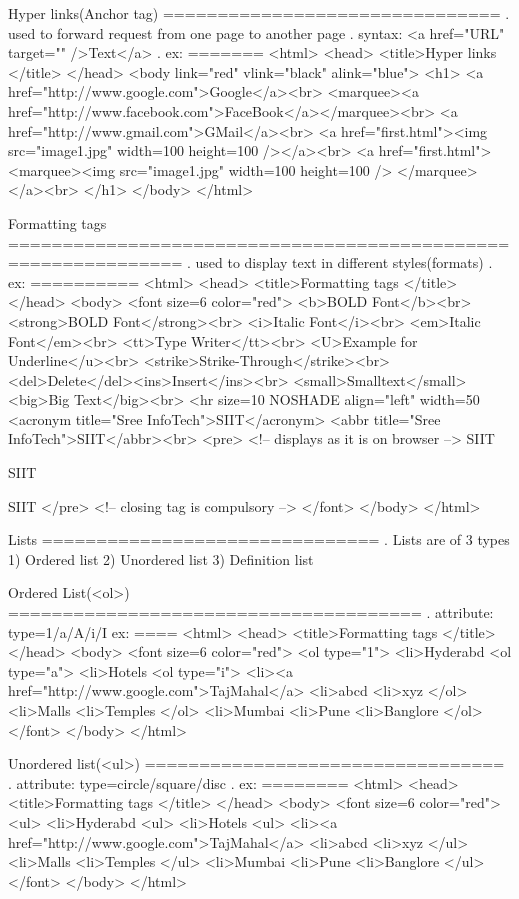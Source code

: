Hyper links(Anchor tag)
===============================
. used to forward request from one page to another page
. syntax: <a href="URL" target="" />Text</a>
. ex:
=======
<html>
  <head>
    <title>Hyper links </title>
  </head>
  <body link="red" vlink="black" alink="blue">
    <h1>
	  <a href="http://www.google.com">Google</a><br>
	  <marquee><a href="http://www.facebook.com">FaceBook</a></marquee><br>
	  <a href="http://www.gmail.com">GMail</a><br>
	  <a href="first.html"><img src="image1.jpg" width=100 height=100 /></a><br>
	  <a href="first.html">
	    <marquee><img src="image1.jpg" width=100 height=100 /> </marquee>
	  </a><br>
    </h1>
  </body>
</html>

Formatting tags
==============================================================
. used to display text in different styles(formats)
. ex:
==========
<html>
  <head>
    <title>Formatting tags </title>
  </head>
  <body>
    <font size=6 color="red">
	   <b>BOLD Font</b><br>
	   <strong>BOLD Font</strong><br>
	   <i>Italic Font</i><br>
	   <em>Italic Font</em><br>
	   <tt>Type Writer</tt><br>
	   <U>Example for Underline</u><br>
	   <strike>Strike-Through</strike><br>
	   <del>Delete</del><ins>Insert</ins><br>
	   <small>Smalltext</small><big>Big Text</big><br>
	   <hr size=10 NOSHADE align="left" width=50%
	   <acronym title="Sree InfoTech">SIIT</acronym>
	   <abbr title="Sree InfoTech">SIIT</abbr><br>
	   <pre> <!-- displays as it is on browser -->
	   SIIT
	      
		  SIIT

		     SIIT
	   </pre> <!-- closing tag is compulsory -->
	</font>
  </body>
</html>

Lists
===============================
. Lists are of 3 types
  1) Ordered list
  2) Unordered list
  3) Definition list

Ordered List(<ol>)
======================================
. attribute: type=1/a/A/i/I
ex:
====
<html>
  <head>
    <title>Formatting tags </title>
  </head>
  <body>
    <font size=6 color="red">
	  <ol type="1">
	     <li>Hyderabd
		 <ol type="a">
		    <li>Hotels
			  <ol type="i">
			     <li><a href="http://www.google.com">TajMahal</a>
				 <li>abcd
				 <li>xyz
			  </ol>
			<li>Malls
			<li>Temples
		 </ol>
		 <li>Mumbai
		 <li>Pune
		 <li>Banglore
	  </ol>
 	</font>
  </body>
</html>

Unordered list(<ul>)
=================================
. attribute: type=circle/square/disc
. ex:
========
<html>
  <head>
    <title>Formatting tags </title>
  </head>
  <body>
    <font size=6 color="red">
	  <ul>
	     <li>Hyderabd
		 <ul>
		    <li>Hotels
			  <ul>
			     <li><a href="http://www.google.com">TajMahal</a>
				 <li>abcd
				 <li>xyz
			  </ul>
			<li>Malls
			<li>Temples
		 </ul>
		 <li>Mumbai
		 <li>Pune
		 <li>Banglore
	  </ul>
 	</font>
  </body>
</html>

